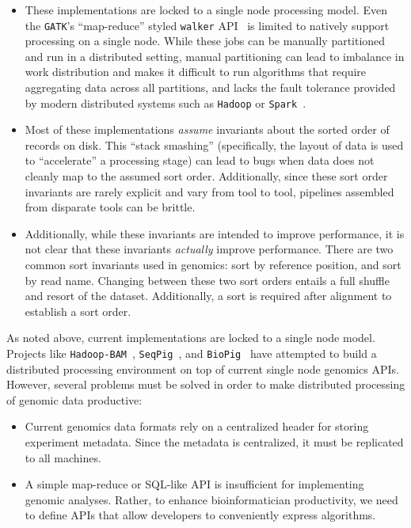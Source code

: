 \documentclass[masters]{ucbthesis}
\begin{document}
\begin{itemize}
\item These implementations are locked to a single node processing model. Even the \texttt{GATK}'s
``map-reduce'' styled \texttt{walker} API~\cite{mckenna10} is limited to natively support processing on
a single node. While these jobs can be manually partitioned and run in a distributed setting, manual
partitioning can lead to imbalance in work distribution and makes it difficult to run algorithms that
require aggregating data across all partitions, and lacks the fault tolerance provided by modern
distributed systems such as \texttt{Hadoop} or \texttt{Spark}~\cite{zaharia12}.
\item Most of these implementations \emph{assume} invariants about the sorted order of records on
disk. This ``stack smashing'' (specifically, the layout of data is used to ``accelerate'' a processing stage)
can lead to bugs when data does not cleanly map to the assumed sort order. Additionally, since these
sort order invariants are rarely explicit and vary from tool to tool, pipelines assembled from disparate
tools can be brittle.
\item Additionally, while these invariants are intended to improve performance, it is not clear that these
invariants \emph{actually} improve performance. There are two common sort invariants used in genomics:
sort by reference position, and sort by read name. Changing between these two sort orders entails
a full shuffle and resort of the dataset. Additionally, a sort is required after alignment to establish a sort order.
\end{itemize}

As noted above, current implementations are locked to a single node model. Projects like
\texttt{Hadoop-BAM}~\cite{niemenmaa12}, \texttt{SeqPig}~\cite{schumacher14}, and \texttt{BioPig}~\cite{nordberg13}
have attempted to build a distributed processing environment on top of current single node genomics APIs.
However, several problems must be solved in order to make distributed processing of genomic data productive:

\begin{itemize}
\item Current genomics data formats rely on a centralized header for storing experiment metadata. Since the
metadata is centralized, it must be replicated to all machines.
\item A simple map-reduce or SQL-like API is insufficient for implementing genomic analyses. Rather, to enhance
bioinformatician productivity, we need to define APIs that allow developers to conveniently express algorithms.
\end{itemize}
\end{document}
